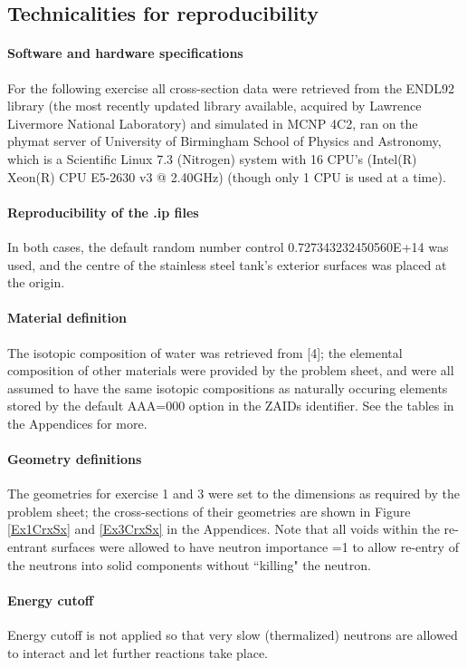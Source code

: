 \documentclass[a4paper, 11pt]{article}
\begin{document}
\subsection{Technicalities for reproducibility}
\paragraph{Software and hardware specifications\indent} For the following exercise all cross-section data were retrieved from the ENDL92 library (the most recently updated library available, acquired by Lawrence Livermore National Laboratory) and simulated in MCNP 4C2, ran on the phymat server of University of Birmingham School of Physics and Astronomy, which is a Scientific Linux 7.3 (Nitrogen) system with 16 CPU's (Intel(R) Xeon(R) CPU E5-2630 v3 @ 2.40GHz) (though only 1 CPU is used at a time).
\paragraph{Reproducibility of the .ip files} In both cases, the default random number control 0.727343232450560E+14 was used, and the centre of the stainless steel tank's exterior surfaces was placed at the origin.
\paragraph{Material definition} The isotopic composition of water was retrieved from [4]; the elemental composition of other materials were provided by the problem sheet, and were all assumed to have the same isotopic compositions as naturally occuring elements stored by the default AAA=000 option in the ZAIDs identifier. See the tables in the Appendices for more.
\paragraph{Geometry definitions\indent} The geometries for exercise 1 and 3 were set to the dimensions as required by the problem sheet; the cross-sections of their geometries are shown in Figure \ref{Ex1CrxSx} and \ref{Ex3CrxSx} in the Appendices. Note that all voids within the re-entrant surfaces were allowed to have neutron importance =1 to allow re-entry of the neutrons into solid components without ``killing" the neutron.
\paragraph{Energy cutoff\indent}
Energy cutoff is not applied so that very slow (thermalized) neutrons are allowed to interact and let further reactions take place.
\end{document}
